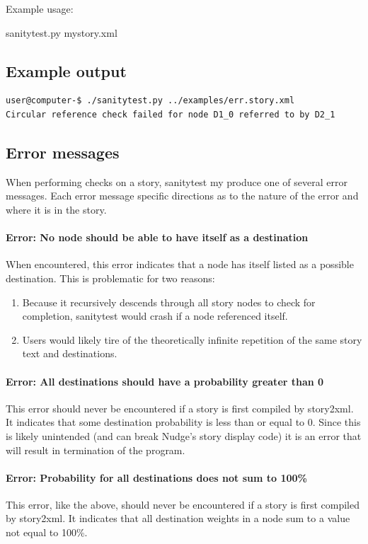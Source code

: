 \documentclass[12pt,letterpaper]{article}
\begin{document}
 Example usage:
 \begin{center}
 sanitytest.py mystory.xml
 \end{center}
 
 \subsection{Example output}
 \begin{lstlisting}[breaklines=true]
user@computer-$ ./sanitytest.py ../examples/err.story.xml
Circular reference check failed for node D1_0 referred to by D2_1
 \end{lstlisting}
 
 \subsection{Error messages}
 When performing checks on a story, sanitytest my produce one of several error messages. Each error message 
 specific directions as to the nature of the error and where it is in the story.
 
 \paragraph{Error: No node should be able to have itself as a destination}
 When encountered, this error indicates that a node has itself listed as a possible destination. This is problematic
 for two reasons: 
 \begin{enumerate}
 \item Because it recursively descends through all story nodes to check for completion, sanitytest would crash if a node referenced itself.
 \item Users would likely tire of the theoretically infinite repetition of the same story text and destinations.
 \end{enumerate}
 
 \paragraph{Error: All destinations should have a probability greater than 0}
 This error should never be encountered if a story is first compiled by story2xml. It indicates that some destination
 probability is less than or equal to 0. Since this is likely unintended (and can break Nudge's story display code)
 it is an error that will result in termination of the program.
 
 \paragraph{Error: Probability for all destinations does not sum to 100\%}
 This error, like the above, should never be encountered if a story is first compiled by story2xml. It indicates that 
 all destination weights in a node sum to a value not equal to 100\%.
 
\end{document}
